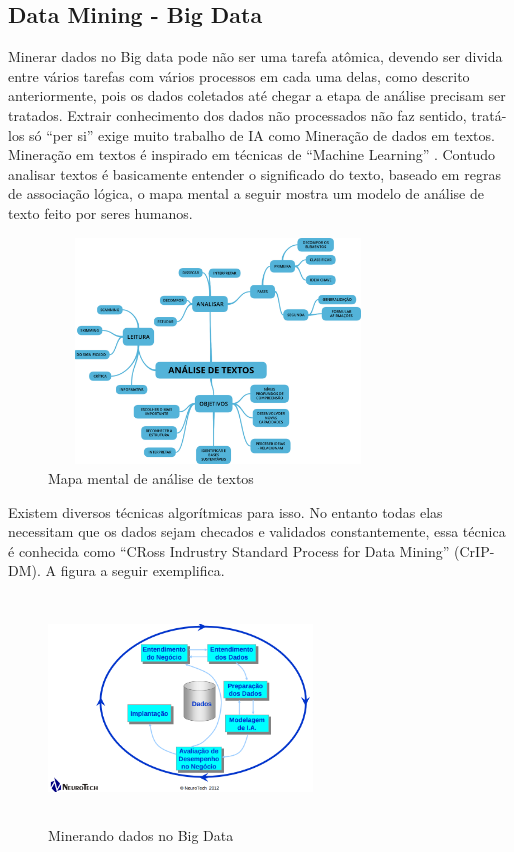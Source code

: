 \documentclass[conference,compsoc]{IEEEtran}
\begin{document}
\subsection{Data Mining - Big Data}\label{arte:palavraChave:DataMiningBigData}

Minerar dados no Big data pode não ser uma tarefa atômica, devendo ser divida entre vários tarefas com vários processos em cada uma delas, como descrito anteriormente, pois os dados coletados até chegar a etapa de análise precisam ser tratados. Extrair conhecimento dos dados não processados não faz sentido, tratá-los só ``per si'' exige muito trabalho de IA como Mineração de dados em textos. Mineração em textos é inspirado em técnicas de ``Machine Learning'' \cite{Aranha2006}. Contudo analisar textos é basicamente entender o significado do texto, baseado em regras de associação lógica, o mapa mental a seguir mostra um modelo de análise de texto feito por seres humanos.

\begin{figure}[!ht]
\centering
\caption{Mapa mental de análise de textos}
\flushleft
\includegraphics[width=90mm, height=60mm]{Figuras/Analise_Textos.png}
\end{figure}

Existem diversos técnicas algorítmicas para isso. No entanto todas elas necessitam que os dados sejam checados e validados constantemente, essa técnica é conhecida como ``CRoss Indrustry Standard Process for Data Mining'' (CrIP-DM). A figura a seguir exemplifica.

\begin{figure}[!ht]
\centering
\caption{Minerando dados no Big Data}
\flushleft
\includegraphics[width=70mm, height=60mm]{Figuras/CrispDM.png}
\end{figure}
\end{document}
